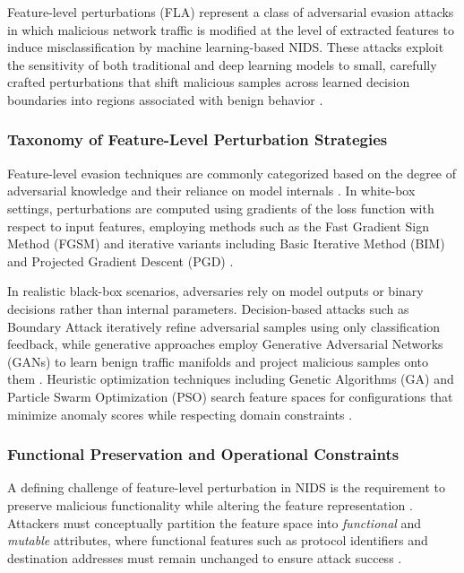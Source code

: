 Feature-level perturbations (FLA) represent a class of adversarial evasion attacks in which malicious network traffic is modified at the level of extracted features to induce misclassification by machine learning-based NIDS. These attacks exploit the sensitivity of both traditional and deep learning models to small, carefully crafted perturbations that shift malicious samples across learned decision boundaries into regions associated with benign behavior \cite{yuan2024simple, zhang2022adversarial}.

\subsubsection{Taxonomy of Feature-Level Perturbation Strategies}

Feature-level evasion techniques are commonly categorized based on the degree of adversarial knowledge and their reliance on model internals \cite{alotaibi2023adversarial}. In white-box settings, perturbations are computed using gradients of the loss function with respect to input features, employing methods such as the Fast Gradient Sign Method (FGSM) and iterative variants including Basic Iterative Method (BIM) and Projected Gradient Descent (PGD) \cite{sharma2024systematic}.

In realistic black-box scenarios, adversaries rely on model outputs or binary decisions rather than internal parameters. Decision-based attacks such as Boundary Attack iteratively refine adversarial samples using only classification feedback, while generative approaches employ Generative Adversarial Networks (GANs) to learn benign traffic manifolds and project malicious samples onto them \cite{wang2024progen}. Heuristic optimization techniques including Genetic Algorithms (GA) and Particle Swarm Optimization (PSO) search feature spaces for configurations that minimize anomaly scores while respecting domain constraints \cite{jiang2022fgmd}.

\subsubsection{Functional Preservation and Operational Constraints}

A defining challenge of feature-level perturbation in NIDS is the requirement to preserve malicious functionality while altering the feature representation \cite{merzouk2022investigating}. Attackers must conceptually partition the feature space into \emph{functional} and \emph{mutable} attributes, where functional features such as protocol identifiers and destination addresses must remain unchanged to ensure attack success \cite{wang2023evasion}.

